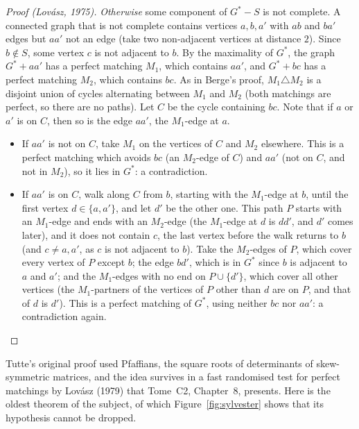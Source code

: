 \begin{proof}[Proof (Lov\'asz, 1975)]
\emph{Otherwise} some component of $G^*-S$ is not complete. A connected graph that is not complete contains vertices $a,b,a'$ with $ab$ and
$ba'$ edges but $aa'$ not an edge (take two non-adjacent vertices at distance $2$). Since $b\notin S$, some vertex $c$ is not adjacent to $b$. By the
maximality of $G^*$, the graph $G^*+aa'$ has a perfect matching $M_1$, which contains $aa'$, and $G^*+bc$ has a perfect matching $M_2$, which contains $bc$.
As in Berge's proof, $M_1\triangle M_2$ is a disjoint union of cycles alternating between $M_1$ and $M_2$ (both matchings are perfect, so
there are no paths). Let $C$ be the cycle containing $bc$. Note that if $a$ or $a'$ is on $C$, then so is the edge $aa'$, the $M_1$-edge at $a$.
\begin{itemize}
\item If $aa'$ is not on $C$, take $M_1$ on the vertices of $C$ and $M_2$ elsewhere. This is a perfect matching which avoids $bc$ (an $M_2$-edge
of $C$) and $aa'$ (not on $C$, and not in $M_2$), so it lies in $G^*$: a contradiction.
\item If $aa'$ is on $C$, walk along $C$ from $b$, starting with the $M_1$-edge at $b$, until the first vertex $d\in\{a,a'\}$, and let $d'$ be the
other one. This path $P$ starts with an $M_1$-edge and ends with an $M_2$-edge (the $M_1$-edge at $d$ is $dd'$, and $d'$ comes later), and it
does not contain $c$, the last vertex before the walk returns to $b$ (and $c\ne a,a'$, as $c$ is not adjacent to $b$). Take the $M_2$-edges of
$P$, which cover every vertex of $P$ except $b$; the edge $bd'$, which is in $G^*$ since $b$ is adjacent to $a$ and $a'$; and the $M_1$-edges with
no end on $P\cup\{d'\}$, which cover all other vertices (the $M_1$-partners of the vertices of $P$ other than $d$ are on $P$, and that of $d$ is
$d'$). This is a perfect matching of $G^*$, using neither $bc$ nor $aa'$: a contradiction again.
\end{itemize}
\end{proof}

Tutte's original proof used Pfaffians, the square roots of determinants of skew-symmetric matrices, and the idea survives in a
fast randomised test for perfect matchings by Lov\'asz (1979) that Tome~C2, Chapter~8, presents. Here is the oldest theorem of the subject,
of which Figure~\ref{fig:sylvester} shows that its hypothesis cannot be dropped.

